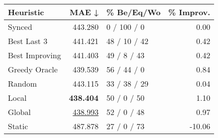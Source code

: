 \begin{tabular}{lrlr}
\toprule
\textbf{Heuristic} & \textbf{MAE ↓} & \textbf{\% Be/Eq/Wo} & \textbf{\% Improv.} \\
\midrule
            Synced &        443.280 &          0 / 100 / 0 &                0.00 \\
\midrule
       Best Last 3 &        441.421 &         48 / 10 / 42 &                0.42 \\
    Best Improving &        441.403 &          49 / 8 / 43 &                0.42 \\
\addlinespace
     Greedy Oracle &        439.539 &          56 / 44 / 0 &                0.84 \\
            Random &        443.115 &         33 / 38 / 29 &                0.04 \\
\midrule
             Local &        \textbf{438.404} &          50 / 0 / 50 &                1.10 \\
            Global &        \underline{438.993} &          52 / 0 / 48 &                0.97 \\
\midrule
            Static &        487.878 &          27 / 0 / 73 &              -10.06 \\
\bottomrule
\end{tabular}

\label{tab:non_lr05_le1_bs4_Summary}
